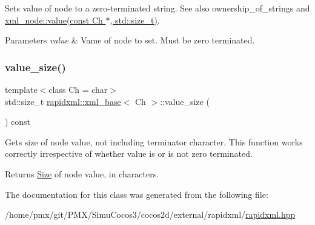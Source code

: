 Sets value of node to a zero-\/terminated string. See also ownership\+\_\+of\+\_\+strings and \hyperlink{classrapidxml_1_1xml__base_a3b183c2db7022a6d30494dd2f0ac11e9}{xml\+\_\+node\+::value(const Ch $\ast$, std\+::size\+\_\+t)}. 
\begin{DoxyParams}{Parameters}
{\em value} & Vame of node to set. Must be zero terminated. \\
\hline
\end{DoxyParams}
\mbox{\label{classrapidxml_1_1xml__base_a2eb123d471b1567fa4832b6ee2b75493}} 
\subsubsection{\texorpdfstring{value\+\_\+size()}{value\_size()}}
{\footnotesize\ttfamily template$<$class Ch  = char$>$ \\
std\+::size\+\_\+t \hyperlink{classrapidxml_1_1xml__base}{rapidxml\+::xml\+\_\+base}$<$ Ch $>$\+::value\+\_\+size (\begin{DoxyParamCaption}{ }\end{DoxyParamCaption}) const\hspace{0.3cm}{\ttfamily [inline]}}

Gets size of node value, not including terminator character. This function works correctly irrespective of whether value is or is not zero terminated. \begin{DoxyReturn}{Returns}
\hyperlink{classSize}{Size} of node value, in characters. 
\end{DoxyReturn}


The documentation for this class was generated from the following file\+:\begin{DoxyCompactItemize}
\item 
/home/pmx/git/\+P\+M\+X/\+Simu\+Cocos3/cocos2d/external/rapidxml/\hyperlink{rapidxml_8hpp}{rapidxml.\+hpp}\end{DoxyCompactItemize}
